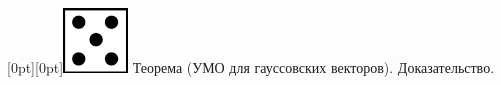 \documentclass[10pt]{amsart}
\begin{document}
\begin{enumerate}
\begin{enumerate}
 \raisebox{-1pt}[0pt][0pt]{\includegraphics[width=0.02\linewidth]{5.png}} Теорема (УМО для гауссовских векторов). Доказательство. \\










    \end{enumerate}
    

\end{enumerate}
\end{document}
